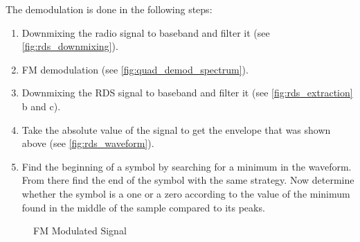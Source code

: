 The demodulation is done in the following steps:
\begin{enumerate}
	\item Downmixing the radio signal to baseband and filter it (see 
		\autoref{fig:rds_downmixing}).
	\item \ac{FM} demodulation (see \autoref{fig:quad_demod_spectrum}).
	\item Downmixing the \ac{RDS} signal to baseband and filter it
		(see \autoref{fig:rds_extraction} b and c).
	\item Take the absolute value of the signal to get the envelope
		that was shown above (see \autoref{fig:rds_waveform}).
	\item Find the beginning of a symbol by searching for a minimum in
		the waveform. From there find the end of the symbol with the
		same strategy. Now determine whether the symbol is a one or a
		zero according to the value of the minimum found in the middle
		of the sample compared to its peaks.
\end{enumerate}

\begin{figure}

\caption{FM Modulated Signal}
\label{fig:rds_downmixing}
\end{figure}


